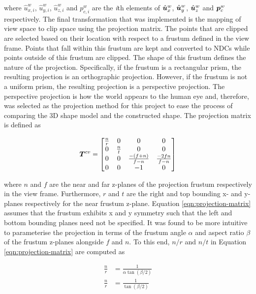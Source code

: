 where $\hat{u}^w_{x,i}$, $\hat{u}^w_{y,i}$, $\hat{u}^w_{z,i}$ and $p^w_{c,i}$ are the \textit{i}th elements of $\hat{\bm{u}}^w_{x}$, $\hat{\bm{u}}^w_{y}$, $\hat{\bm{u}}^w_{z}$ and $\bm{p}^w_{c}$ respectively. The final transformation that was implemented is the mapping of view space to clip space using the projection matrix. The points that are clipped are selected based on their location with respect to a frustum defined in the view frame. Points that fall within this frustum are kept and converted to NDCs while points outside of this frustum are clipped. The shape of this frustum defines the nature of the projection. Specifically, if the frustum is a rectangular prism, the resulting projection is an orthographic projection. However, if the frustum is not a uniform prism, the resulting projection is a perspective projection. The perspective projection is how the world appears to the human eye and, therefore, was selected as the projection method for this project to ease the process of comparing the 3D shape model and the constructed shape. The projection matrix is defined as

\begin{equation}
	\bm{T}^{cv}=
	\begin{bmatrix}
		\frac{n}{r} & 0 & 0 & 0 \\
		0 & \frac{n}{t} & 0 & 0 \\
		0 & 0 & \frac{-(f+n)}{f-n} & \frac{-2fn}{f-n} \\
		0 & 0 & -1 & 0
	\end{bmatrix}
\label{eqn:projection-matrix}
\end{equation}

where $n$ and $f$ are the near and far z-planes of the projection frustum respectively in the view frame. Furthermore, $r$ and $t$ are the right and top bounding x- and y-planes respectively for the near frustum z-plane. Equation \ref{eqn:projection-matrix} assumes that the frustum exhibits x and y symmetry such that the left and bottom bounding planes need not be specified. It was found to be more intuitive to parameterise the projection in terms of the frustum angle $\alpha$ and aspect ratio $\beta$ of the frustum z-planes alongside $f$ and $n$. To this end, $n/r$ and $n/t$ in Equation \ref{eqn:projection-matrix} are computed as

\begin{align}
	\frac{n}{r}&=\frac{1}{\alpha\tan(\beta/2)}\\
	\frac{n}{r}&=\frac{1}{\tan(\beta/2)}
\end{align} 

